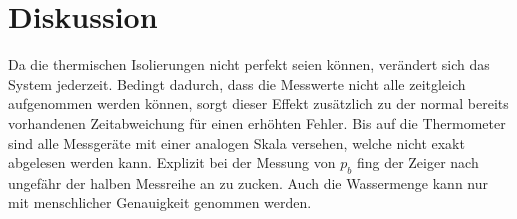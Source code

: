 \section{Diskussion}
\label{sec:Diskussion}
Da die thermischen Isolierungen nicht perfekt seien können, verändert sich das System jederzeit.
Bedingt dadurch, dass die Messwerte nicht alle zeitgleich aufgenommen werden können, sorgt dieser Effekt zusätzlich zu der normal bereits vorhandenen Zeitabweichung für einen erhöhten Fehler.
Bis auf die Thermometer sind alle Messgeräte mit einer analogen Skala versehen, welche nicht exakt abgelesen werden kann. Explizit bei der Messung von $p_b$ fing der Zeiger nach ungefähr der halben Messreihe an zu zucken.
Auch die Wassermenge kann nur mit menschlicher Genauigkeit genommen werden.
